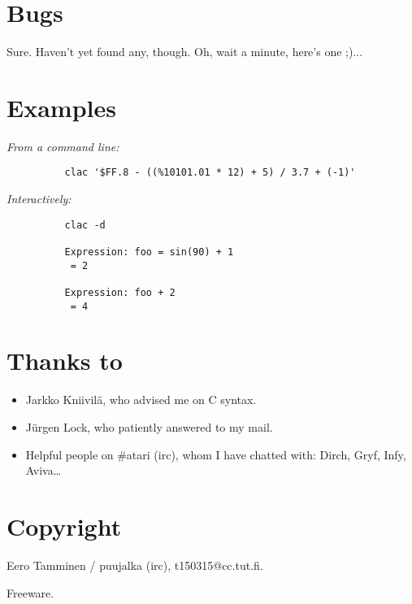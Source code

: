 \section{Bugs}

	Sure. Haven't yet found any, though. Oh, wait a minute, here's
	one ;)...


\section{Examples}

	{\sl From a command line:}
	{\tt \begin{verbatim}
	      clac '$FF.8 - ((%10101.01 * 12) + 5) / 3.7 + (-1)'
	\end{verbatim}}

	{\sl Interactively:}
	{\tt \begin{verbatim}
	      clac -d

	      Expression: foo = sin(90) + 1
	       = 2

	      Expression: foo + 2
	       = 4
	\end{verbatim}}


\section{Thanks to}

	\begin{itemize}
	\item	Jarkko Kniivil\"a, who advised me on C syntax.
	\item	J\"urgen Lock, who patiently answered to my mail.
	\item	Helpful people on \#atari (irc), whom I have
		chatted with: Dirch, Gryf, Infy, Aviva\dots
	\end{itemize}


\section{Copyright}

	Eero Tamminen / puujalka (irc), t150315@cc.tut.fi.

	Freeware.


